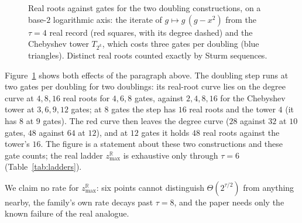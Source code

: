 \documentclass[11pt]{article}
\theoremstyle{definition}
\theoremstyle{remark}
\newcommand{\zrmax}{z^{\mathbb{R}}_{\max}}
\begin{document}
\begin{figure}[t]
\centering
{}
\caption{Real roots against gates for the two doubling constructions, on a base-$2$ logarithmic
axis: the iterate of $g \mapsto g\,(g - x^2)$ from the $\tau = 4$ real record (red squares,
with its degree dashed) and the Chebyshev tower $T_{2^k}$, which costs three gates per doubling
(blue triangles). Distinct real roots counted exactly by Sturm sequences.}
\label{fig:doubling}
\end{figure}

Figure~\ref{fig:doubling} shows both effects of the paragraph above. The doubling step
runs at two gates per doubling for two doublings: its real-root curve lies on the degree
curve at $4, 8, 16$ real roots for $4, 6, 8$ gates, against $2, 4, 8, 16$ for the Chebyshev
tower at $3, 6, 9, 12$ gates; at $8$ gates the step has $16$ real roots and the tower $4$ (it has
$8$ at $9$ gates). The red curve then leaves the degree curve ($28$ against $32$ at $10$ gates,
$48$ against $64$ at $12$), and at $12$ gates it holds $48$ real roots against the tower's $16$.
The figure is a statement about these two constructions and these gate counts; the real ladder
$\zrmax$ is exhaustive only through $\tau = 6$ (Table~\ref{tab:ladders}).

We claim no rate for $\zrmax$: six points cannot distinguish
$\Theta(2^{\tau/2})$ from anything nearby, the family's own rate decays past
$\tau = 8$, and the paper needs only the known failure of the real analogue.
\end{document}
